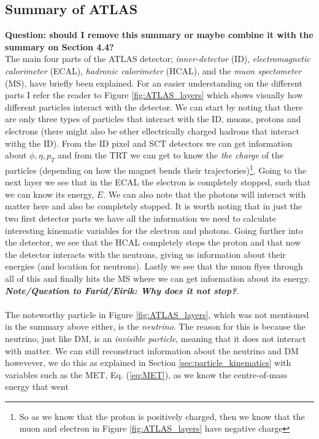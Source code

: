 \documentclass[12pt, a4paper]{book}
\begin{document}
\subsection{Summary of ATLAS}
\textbf{Question: should I remove this summary or maybe combine it with the summary on Section 4.4?}\\
The main four parts of the ATLAS detector; \textit{inner-detector} (ID), \textit{electromagnetic calorimeter} (ECAL), \textit{hadronic calorimeter} (HCAL), and the \textit{muon spectometer} (MS), have 
briefly been explained. For an easier understanding on the different parts I refer the reader to Figure \ref{fig:ATLAS_layers} which shows visually how different particles interact with the detector. We can start by noting that there are only three types 
of particles that interact with the ID, muons, protons and electrons (there might also be other ellectrically charged hadrons that interact withg the ID). From the ID pixel and SCT detectors we can get information about $\phi,\eta, p_T$ and from the TRT we  
can get to know the \textit{the charge} of the particles (depending on how the magnet bends their trajectories)\footnote{So as we know that the proton is positively charged, then we know that the muon and electron in Figure \ref{fig:ATLAS_layers} have negative charge}. 
Going to the next layer we see that in the ECAL the electron is completely stopped, such that we can know its energy, $E$. We can also note that the photons will interact with matter here and also be completely stopped. It is worth noting that in just the two 
first detector parts we have all the information we need to calculate interesting kinematic variables for the electron and photons. Going further into the detector, we see that the HCAL completely stops the proton and that now the detector interacts with the neutrons, giving us 
information about their energies (and location for neutrons). Lastly we see that the muon flyes through all of this and finally hits the MS where we can get information about its energy. \textit{\textbf{Note/Question to Farid/Eirik: Why does it not stop?}}. \\
\\The noteworthy particle in Figure \ref{fig:ATLAS_layers}, which was not mentioned in the summary above either, is the \textit{neutrino}. The reason for this is because the neutrino, just like DM, is an \textit{invisible particle}, meaning that it does not 
interact with matter. We can still reconstruct information about the neutrino and DM howevever, we do this as explained in Section \ref{sec:particle_kinematics} with variables such as the MET, Eq. (\ref{eq:MET}), as we know the centre-of-mass energy that went 
\end{document}

